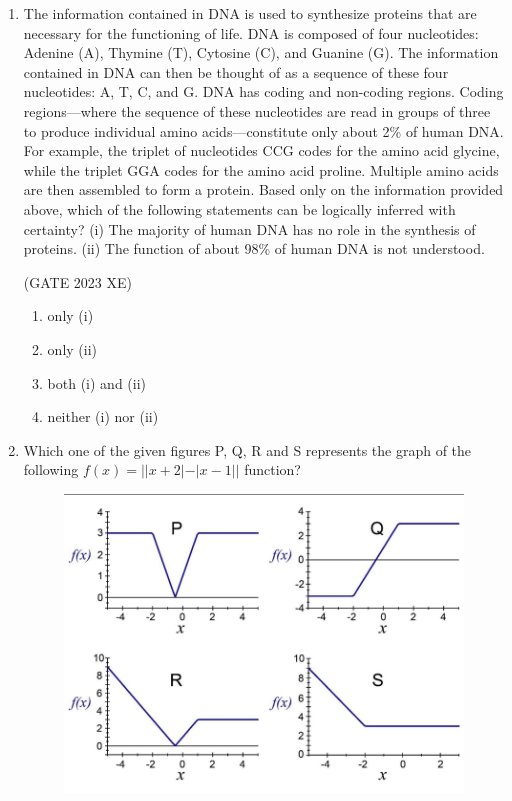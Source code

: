 \documentclass[journal,12pt,onecolumn]{IEEEtran}
\begin{document}
\begin{enumerate}
\item The information contained in DNA is used to synthesize proteins that are 
necessary for the functioning of life. DNA is composed of four nucleotides: 
Adenine (A), Thymine (T), Cytosine (C), and Guanine (G). The information 
contained in DNA can then be thought of as a sequence of these four nucleotides: 
A, T, C, and G. DNA has coding and non-coding regions. Coding regions—where 
the sequence of these nucleotides are read in groups of three to produce individual 
amino  
acids—constitute only about 2\% of human DNA. For example, the triplet of 
nucleotides CCG codes for the amino acid glycine, while the triplet GGA codes 
for the amino acid proline. Multiple amino acids are then assembled to form a 
protein.  
Based only on the information provided above, which of the following statements 
can be logically inferred with certainty? 
(i) 
The majority of human DNA has no role in the synthesis of proteins. 
(ii) 
The function of about 98\% of human DNA is not understood.

\hfill{(GATE 2023 XE)}

\begin{multicols}{2}

\begin{enumerate}

\item only (i)

\item only (ii)

\item both (i) and (ii)

\item neither (i) nor (ii)

\end{enumerate}

\end{multicols}

\item Which one of the given figures P, Q, R and S represents the graph of the following $f(x) = ||x+2| - |x-1||$ function? 


\begin{figure}[htbp]

\centering

\includegraphics[width=.7\columnwidth]{figs/GA/fig2.png}


\end{figure}
\end{enumerate}
\end{document}
